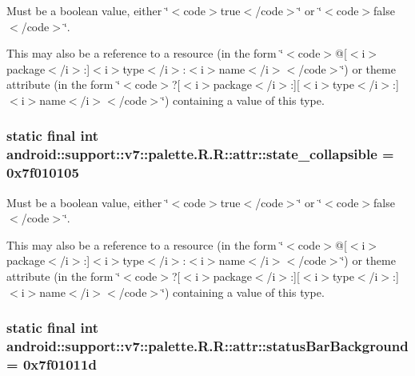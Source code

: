 Must be a boolean value, either \char`\"{}$<$code$>$true$<$/code$>$\char`\"{} or \char`\"{}$<$code$>$false$<$/code$>$\char`\"{}. 

This may also be a reference to a resource (in the form \char`\"{}$<$code$>$@\mbox{[}$<$i$>$package$<$/i$>$:\mbox{]}$<$i$>$type$<$/i$>$:$<$i$>$name$<$/i$>$$<$/code$>$\char`\"{}) or theme attribute (in the form \char`\"{}$<$code$>$?\mbox{[}$<$i$>$package$<$/i$>$:\mbox{]}\mbox{[}$<$i$>$type$<$/i$>$:\mbox{]}$<$i$>$name$<$/i$>$$<$/code$>$\char`\"{}) containing a value of this type. \hypertarget{classandroid_1_1support_1_1v7_1_1palette_1_1_r_1_1attr_1bbf3b63a209eb7808c3303876988ab9}{
\subsubsection[{state\_\-collapsible}]{\setlength{\rightskip}{0pt plus 5cm}static final int android::support::v7::palette.R.R::attr::state\_\-collapsible = 0x7f010105}}
\label{classandroid_1_1support_1_1v7_1_1palette_1_1_r_1_1attr_1bbf3b63a209eb7808c3303876988ab9}


Must be a boolean value, either \char`\"{}$<$code$>$true$<$/code$>$\char`\"{} or \char`\"{}$<$code$>$false$<$/code$>$\char`\"{}. 

This may also be a reference to a resource (in the form \char`\"{}$<$code$>$@\mbox{[}$<$i$>$package$<$/i$>$:\mbox{]}$<$i$>$type$<$/i$>$:$<$i$>$name$<$/i$>$$<$/code$>$\char`\"{}) or theme attribute (in the form \char`\"{}$<$code$>$?\mbox{[}$<$i$>$package$<$/i$>$:\mbox{]}\mbox{[}$<$i$>$type$<$/i$>$:\mbox{]}$<$i$>$name$<$/i$>$$<$/code$>$\char`\"{}) containing a value of this type. \hypertarget{classandroid_1_1support_1_1v7_1_1palette_1_1_r_1_1attr_e511835ab000b4856dfc000e07ea59a2}{
\subsubsection[{statusBarBackground}]{\setlength{\rightskip}{0pt plus 5cm}static final int android::support::v7::palette.R.R::attr::statusBarBackground = 0x7f01011d}}
\label{classandroid_1_1support_1_1v7_1_1palette_1_1_r_1_1attr_e511835ab000b4856dfc000e07ea59a2}


